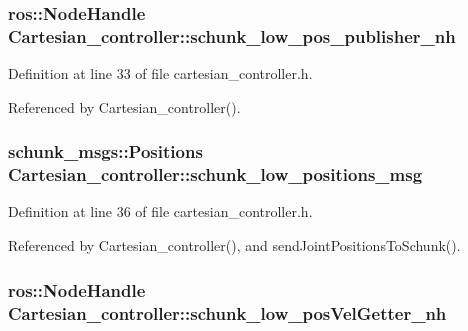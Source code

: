\hypertarget{classCartesian__controller_aabe48e7ab08b0235d4cd94213b8faf5d}{
\subsubsection[{schunk\-\_\-low\-\_\-pos\-\_\-publisher\-\_\-nh}]{\setlength{\rightskip}{0pt plus 5cm}ros\-::\-Node\-Handle Cartesian\-\_\-controller\-::schunk\-\_\-low\-\_\-pos\-\_\-publisher\-\_\-nh\hspace{0.3cm}{\ttfamily [protected]}}}\label{classCartesian__controller_aabe48e7ab08b0235d4cd94213b8faf5d}


Definition at line 33 of file cartesian\-\_\-controller.\-h.



Referenced by Cartesian\-\_\-controller().

\hypertarget{classCartesian__controller_a2dd700542bd6243eef10d34811055584}{
\subsubsection[{schunk\-\_\-low\-\_\-positions\-\_\-msg}]{\setlength{\rightskip}{0pt plus 5cm}schunk\-\_\-msgs\-::\-Positions Cartesian\-\_\-controller\-::schunk\-\_\-low\-\_\-positions\-\_\-msg\hspace{0.3cm}{\ttfamily [protected]}}}\label{classCartesian__controller_a2dd700542bd6243eef10d34811055584}


Definition at line 36 of file cartesian\-\_\-controller.\-h.



Referenced by Cartesian\-\_\-controller(), and send\-Joint\-Positions\-To\-Schunk().

\hypertarget{classCartesian__controller_aeed01809bd5240663c7acfade245a386}{
\subsubsection[{schunk\-\_\-low\-\_\-pos\-Vel\-Getter\-\_\-nh}]{\setlength{\rightskip}{0pt plus 5cm}ros\-::\-Node\-Handle Cartesian\-\_\-controller\-::schunk\-\_\-low\-\_\-pos\-Vel\-Getter\-\_\-nh\hspace{0.3cm}{\ttfamily [protected]}}}\label{classCartesian__controller_aeed01809bd5240663c7acfade245a386}


